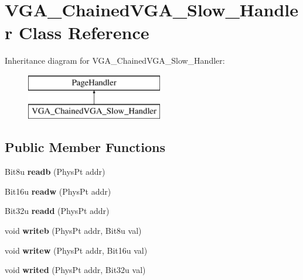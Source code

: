 \hypertarget{classVGA__ChainedVGA__Slow__Handler}{\section{V\-G\-A\-\_\-\-Chained\-V\-G\-A\-\_\-\-Slow\-\_\-\-Handler Class Reference}
\label{classVGA__ChainedVGA__Slow__Handler}
}
Inheritance diagram for V\-G\-A\-\_\-\-Chained\-V\-G\-A\-\_\-\-Slow\-\_\-\-Handler\-:\begin{figure}[H]
\begin{center}
\leavevmode
\includegraphics[height=2.000000cm]{classVGA__ChainedVGA__Slow__Handler}
\end{center}
\end{figure}
\subsection*{Public Member Functions}
\begin{DoxyCompactItemize}
\item 
\hypertarget{classVGA__ChainedVGA__Slow__Handler_acebea884c2d72d200bd30d3031dff53d}{Bit8u {\bfseries readb} (Phys\-Pt addr)}\label{classVGA__ChainedVGA__Slow__Handler_acebea884c2d72d200bd30d3031dff53d}

\item 
\hypertarget{classVGA__ChainedVGA__Slow__Handler_a3c26eb708d9cc07736f3ca2f6b3fc07b}{Bit16u {\bfseries readw} (Phys\-Pt addr)}\label{classVGA__ChainedVGA__Slow__Handler_a3c26eb708d9cc07736f3ca2f6b3fc07b}

\item 
\hypertarget{classVGA__ChainedVGA__Slow__Handler_a835c10cdd5b68278cc95fd8a27c49030}{Bit32u {\bfseries readd} (Phys\-Pt addr)}\label{classVGA__ChainedVGA__Slow__Handler_a835c10cdd5b68278cc95fd8a27c49030}

\item 
\hypertarget{classVGA__ChainedVGA__Slow__Handler_a61068eb2ab155e392747d18f3b7a77df}{void {\bfseries writeb} (Phys\-Pt addr, Bit8u val)}\label{classVGA__ChainedVGA__Slow__Handler_a61068eb2ab155e392747d18f3b7a77df}

\item 
\hypertarget{classVGA__ChainedVGA__Slow__Handler_a278f215a8ac954eb53213077dba4a692}{void {\bfseries writew} (Phys\-Pt addr, Bit16u val)}\label{classVGA__ChainedVGA__Slow__Handler_a278f215a8ac954eb53213077dba4a692}

\item 
\hypertarget{classVGA__ChainedVGA__Slow__Handler_a2ba2dc0eec70d4820084e93e73f8de6d}{void {\bfseries writed} (Phys\-Pt addr, Bit32u val)}\label{classVGA__ChainedVGA__Slow__Handler_a2ba2dc0eec70d4820084e93e73f8de6d}

\end{DoxyCompactItemize}
